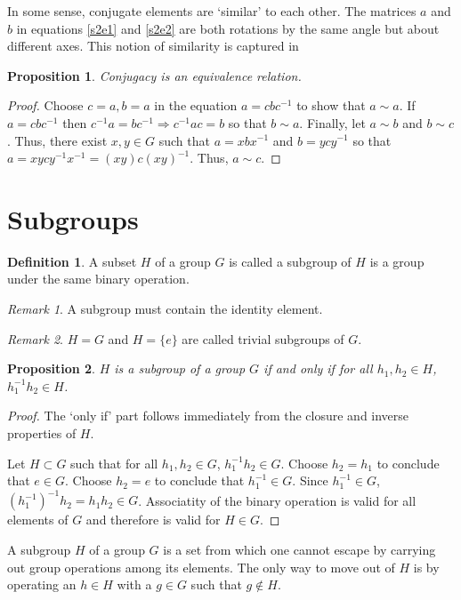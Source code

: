 \documentclass{article}
\theoremstyle{plain}
\numberwithin{thm}{section}
\theoremstyle{plain}
\newtheorem{prop}{Proposition}
\numberwithin{prop}{section}
\theoremstyle{definition}
\newtheorem{defn}{Definition}
\numberwithin{defn}{section}
\theoremstyle{remark}
\newtheorem*{rem}{Remark}
\numberwithin{equation}{section}
\begin{document}
In some sense, conjugate elements are `similar' to each other. The matrices
$a$ and $b$ in equations \eqref{s2e1} and \eqref{s2e2} are both rotations 
by the same angle but about different axes. This notion of similarity is 
captured in
\begin{prop}\label{s2p1}
Conjugacy is an equivalence relation.
\end{prop}
\begin{proof}
Choose $c = a, b = a$ in the equation $a = cbc^{-1}$ to show that $a \sim a$.
If $a = cbc^{-1}$ then $c^{-1}a = bc^{-1} \Rightarrow c^{-1}ac = b$ so that
$b \sim a$. Finally, let $a \sim b$ and $b \sim c$. Thus, there exist $x, y
\in G$ such that $a = xbx^{-1}$ and $b = ycy^{-1}$ so that $a = xycy^{-1}x^{-1}
= (xy)c(xy)^{-1}$. Thus, $a \sim c$.
\end{proof}

\section{Subgroups}\label{s3}
\begin{defn}\label{s3d1}
A subset $H$ of a group $G$ is called a subgroup of $H$ is a group under
the same binary operation.
\end{defn}

\begin{rem}
A subgroup must contain the identity element.
\end{rem}

\begin{rem}
$H = G$ and $H = \{e\}$ are called trivial subgroups of $G$.
\end{rem}

\begin{prop}\label{s3p1}
$H$ is a subgroup of a group $G$ if and only if for all $h_1, h_2 \in H$,
$h_1^{-1}h_2 \in H$.
\end{prop}
\begin{proof}
The `only if' part follows immediately from the closure and inverse properties
of $H$.

Let $H \subset G$ such that for all $h_1, h_2 \in G$, $h_1^{-1}h_2 \in G$.
Choose $h_2 = h_1$ to conclude that $e \in G$. Choose $h_2 = e$ to conclude
that $h_1^{-1} \in G$. Since $h_1^{-1} \in G$, $(h_1^{-1})^{-1}h_2 = h_1h_2
\in G$. Associatity of the binary operation is valid for all elements of $G$
and therefore is valid for $H \in G$.
\end{proof}

A subgroup $H$ of a group $G$ is a set from which one cannot escape by carrying
out group operations among its elements. The only way to move out of $H$ is
by operating an $h \in H$ with a $g \in G$ such that $g \notin H$.
\end{document}
